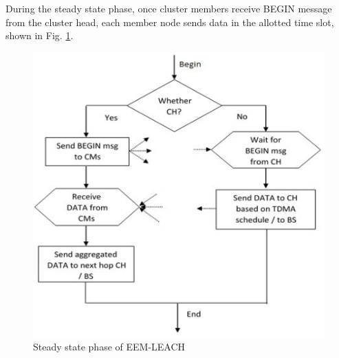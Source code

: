 \documentclass[11pt]{report}
\begin{document}
\begin{itemize}
		During the steady state phase, once cluster members receive BEGIN message from the cluster head, each member node sends data in the allotted time slot, shown in Fig. \ref {fig8}. 
		\begin{figure}[h!]
			\centering
			\includegraphics[width=0.45\linewidth]{8th.jpg}
			\caption{Steady state phase of EEM-LEACH}
			\label{fig8}
		\end{figure}
	\end{itemize}
\end{document}
